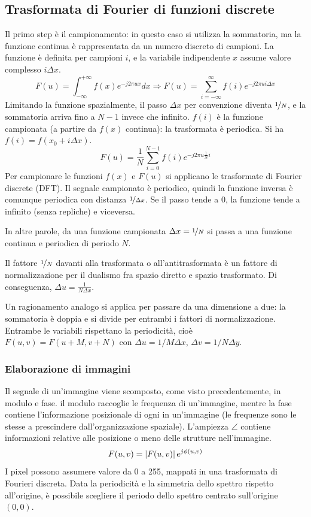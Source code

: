 \subsection{Trasformata di Fourier di funzioni discrete}
Il primo step è il campionamento: in questo caso si utilizza la sommatoria, ma la funzione continua è rappresentata da un numero discreto di campioni. La funzione è definita per campioni $i$, e la variabile indipendente $x$ assume valore complesso $i\Delta x$.
$$F(u) = \int_{-\infty}^{+\infty} f(x)e^{-j2\pi ux} dx \Longrightarrow F(u) = \sum_{i=-\infty}^{\infty} f(i)e^{-j2\pi ui\Delta x}$$
Limitando la funzione spazialmente, il passo $\Delta x$ per convenzione diventa $\nicefrac{1}{N}$, e la sommatoria arriva fino a $N - 1$ invece che infinito. $f(i)$ è la funzione campionata (a partire da $f(x)$ continua): la trasformata è periodica. Si ha $f(i) = f(x_0 + i\Delta x)$.
$$F(u) = \frac{1}{N} \sum_{i=0}^{N-1} f(i)e^{-j2\pi u \frac{1}{N}i}$$
Per campionare le funzioni $f(x)$ e $F(u)$ si applicano le trasformate di Fourier discrete (DFT). Il segnale campionato è periodico, quindi la funzione inversa è comunque periodica con distanza $\nicefrac{1}{\Delta x}$. Se il passo tende a 0, la funzione tende a infinito (senza repliche) e viceversa. 

In altre parole, da una funzione campionata $\Delta x = \nicefrac{1}{N}$ si passa a una funzione continua e periodica di periodo $N$. 

Il fattore $\nicefrac{1}{N}$ davanti alla trasformata o all'antitrasformata è un fattore di normalizzazione per il dualismo fra spazio diretto e spazio trasformato. Di conseguenza, $\Delta u = \frac{1}{N\Delta x}$.

Un ragionamento analogo si applica per passare da una dimensione a due: la sommatoria è doppia e si divide per entrambi i fattori di normalizzazione. Entrambe le variabili rispettano la periodicità, cioè $F(u, v) = F(u + M, v + N)$ con $\Delta u = 1/M \Delta x$, $\Delta v = 1/N \Delta y$.

\subsubsection{Elaborazione di immagini}
Il segnale di un'immagine viene scomposto, come visto precedentemente, in modulo e fase. il modulo raccoglie le frequenza di un'immagine, mentre la fase contiene l'informazione posizionale di ogni in un'immagine (le frequenze sono le stesse a prescindere dall'organizzazione spaziale). L'ampiezza $\angle$ contiene informazioni relative alle posizione o meno delle strutture nell'immagine.
$$F(u, v) = \left|F(u, v)\right|e^{j\phi(u, v)}$$
I pixel possono assumere valore da 0 a 255, mappati in una trasformata di Fourieri discreta. Data la periodicità e la simmetria dello spettro rispetto all'origine, è possibile scegliere il periodo dello spettro centrato sull'origine $(0, 0)$.

